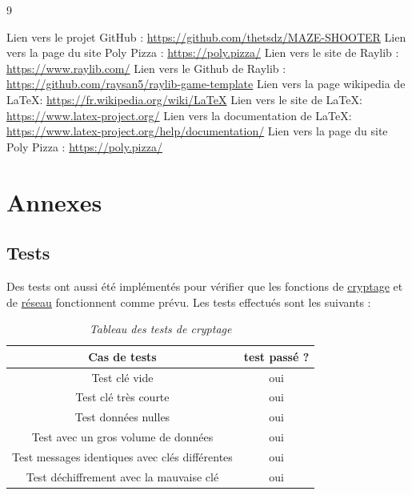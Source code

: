 \documentclass[a4paper,11pt]{article}
\begin{document}
\begin{thebibliography}{9}

Lien vers le projet GitHub : \url{https://github.com/thetsdz/MAZE-SHOOTER}
Lien vers la page du site Poly Pizza : \url{https://poly.pizza/}
 Lien vers le site de Raylib : \url{https://www.raylib.com/} 
 Lien vers le Github de Raylib : \url{https://github.com/raysan5/raylib-game-template}
 Lien vers la page wikipedia de \LaTeX : \url{https://fr.wikipedia.org/wiki/LaTeX}
 Lien vers le site de \LaTeX : \url{https://www.latex-project.org/}
 Lien vers la documentation de \LaTeX : \url{https://www.latex-project.org/help/documentation/}
Lien vers la page du site Poly Pizza : \href{https://poly.pizza/}{https://poly.pizza/}

\end{thebibliography}

\appendix
\section{Annexes}

\subsection{Tests}

Des tests ont aussi été implémentés pour vérifier que les fonctions de \hyperref[testCrypt]{cryptage} et de \hyperref[testReseau]{réseau} fonctionnent comme prévu. 
Les tests effectués sont les suivants :

\bigskip

\begin{table}[H]
    \centering
    \begin{tabular}{|c|c|}
        \hline
        Cas de tests & test passé ? \\
        \hline
        Test clé vide & oui \\
        \hline
        Test clé très courte & oui \\
        \hline
        Test données nulles & oui \\
        \hline
        Test avec un gros volume de données & oui \\
        \hline
        Test messages identiques avec clés différentes & oui \\
        \hline
        Test déchiffrement avec la mauvaise clé & oui \\
        \hline
    \end{tabular}
    \caption{\emph{Tableau des tests de cryptage}}
    \label{testCrypt}
\end{table}
\end{document}
